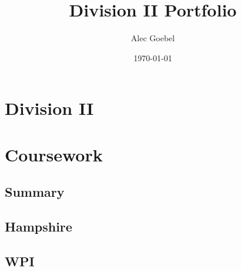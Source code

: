 \documentclass[letterpaper,twoside]{portfolio}
\title{Division II Portfolio}
\author{Alec Goebel}
\date{\today}
\begin{document}
\maketitle
\tableofcontents

\part{Division II}



 
\part{Coursework}

\chapter{Summary}

\chapter{Hampshire}

















\chapter{WPI}











%
%
\end{document}
